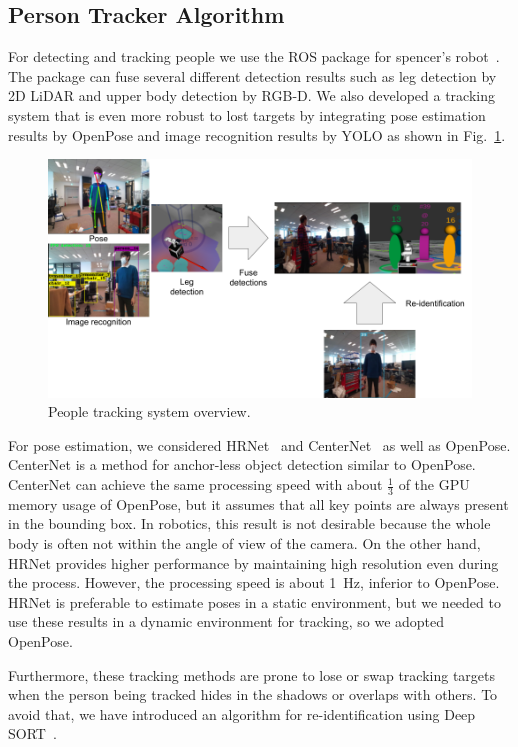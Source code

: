 \documentclass[runningheads,a4paper]{llncs}
\begin{document}
\subsection{Person Tracker Algorithm}
For detecting and tracking people we use the ROS package for spencer's robot~\cite{Linder2016}.
The package can fuse several different detection results such as leg detection by 2D LiDAR and upper body detection by RGB-D.
We also developed a tracking system that is even more robust to lost targets by integrating pose estimation results by OpenPose and image recognition results by YOLO as shown in Fig.~\ref{fig:track_people}.
\begin{figure}[tbp]
    \centering
    \includegraphics[width=0.8\linewidth]{images/people_track.png}
    \caption{People tracking system overview.}
    \label{fig:track_people}
\end{figure}

For pose estimation, we considered HRNet~\cite{sun2019deep} and CenterNet~\cite{zhou2019objects} as well as OpenPose.
CenterNet is a method for anchor-less object detection similar to OpenPose.
CenterNet can achieve the same processing speed with about $\frac{1}{3}$ of the GPU memory usage of OpenPose, but it assumes that all key points are always present in the bounding box.
In robotics, this result is not desirable because the whole body is often not within the angle of view of the camera.
On the other hand, HRNet provides higher performance by maintaining high resolution even during the process.
However, the processing speed is about 1~Hz, inferior to OpenPose.
HRNet is preferable to estimate poses in a static environment, but we needed to use these results in a dynamic environment for tracking, so we adopted OpenPose.

Furthermore, these tracking methods are prone to lose or swap tracking targets when the person being tracked hides in the shadows or overlaps with others.
To avoid that, we have introduced an algorithm for re-identification using Deep SORT~\cite{Wojke2018deep}.
\end{document}
